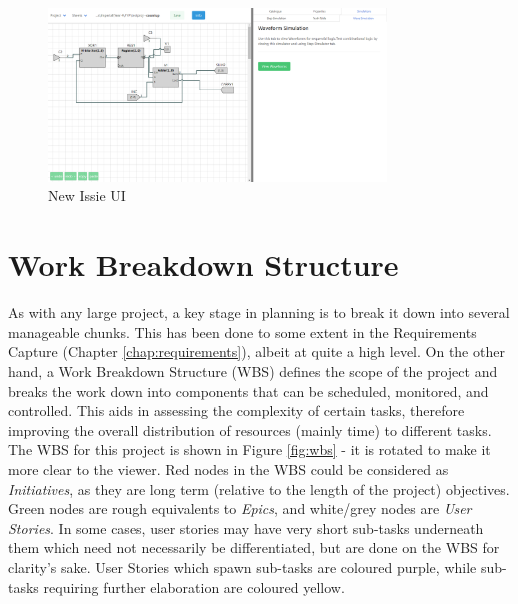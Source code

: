 \begin{figure}
    \centering
    \includegraphics[width=0.8\textwidth]{05.ImpPlan/NewUI.png}
    \caption{New Issie UI}
    \label{fig:NewUI}
\end{figure}

\section{Work Breakdown Structure}
As with any large project, a key stage in planning is to break it down into several manageable chunks. This has been done to some extent in the Requirements Capture (Chapter \ref{chap:requirements}), albeit at quite a high level. On the other hand, a Work Breakdown Structure (WBS) \cite{projectmanagement} defines the scope of the project and breaks the work down into components that can be scheduled, monitored, and controlled. This aids in assessing the complexity of certain tasks, therefore improving the overall distribution of resources (mainly time) to different tasks. The WBS for this project is shown in Figure \ref{fig:wbs} - it is rotated to make it more clear to the viewer. Red nodes in the WBS could be considered as \emph{Initiatives}, as they are long term (relative to the length of the project) objectives. Green nodes are rough equivalents to \emph{Epics}, and white/grey nodes are \emph{User Stories}. In some cases, user stories may have very short sub-tasks underneath them which need not necessarily be differentiated, but are done on the WBS for clarity's sake. User Stories which spawn sub-tasks are coloured purple, while sub-tasks requiring further elaboration are coloured yellow. 

